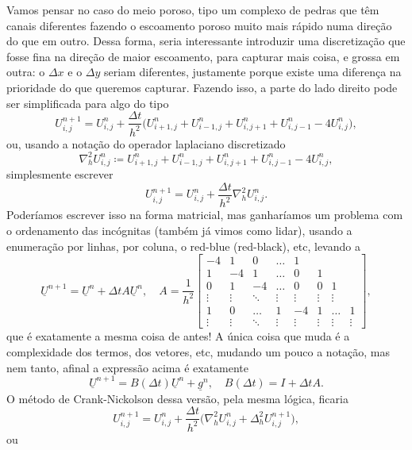 \documentclass[../differential_methods.tex]{subfiles}
\begin{document}
Vamos pensar no caso do meio poroso, tipo um complexo de pedras que têm canais diferentes fazendo o escoamento poroso muito mais rápido numa direção do que em outro. Dessa forma, seria interessante introduzir uma discretização que fosse fina na direção de maior escoamento, para capturar mais coisa, e grossa em outra: o \(\Delta x\) e o \(\Delta y\) seriam diferentes, justamente porque existe uma diferença na prioridade do que queremos capturar. Fazendo isso, a parte do lado direito pode ser simplificada para algo do tipo
\[
	U_{i,j}^{n+1} = U_{i, j}^{n}+\frac{\Delta t}{h^{2}}\biggl(U_{i+1, j}^{n} + U_{i-1, j}^{n} + U_{i, j+1}^{n} + U_{i, j-1}^{n} - 4U_{i, j}^{n}\biggr),
\]
ou, usando a notação do operador laplaciano discretizado
\[
	\nabla_{h}^{2} U_{i, j}^{n} \coloneqq U_{i+1, j}^{n} + U_{i-1, j}^{n} + U_{i, j+1}^{n} + U_{i, j-1}^{n} - 4U_{i, j}^{n},
\]
simplesmente escrever
\[
	U_{i, j}^{n+1} = U_{i, j}^{n} + \frac{\Delta t}{h^{2}}\nabla_{h}^{2}U_{i, j}^{n}.
\]
Poderíamos escrever isso na forma matricial, mas ganharíamos um problema com o ordenamento das incógnitas (também já vimos como lidar), usando a enumeração por linhas, por coluna, o red-blue (red-black), etc, levando a
\[
	\underline{U}^{n+1} = \underline{U}^{n} + \Delta t A \underline{U}^{n}, \quad A = \frac{1}{h^{2}}\begin{bmatrix}
		-4     & 1      & 0      & \dotsc & 1      &        &        &        \\
		1      & -4     & 1      & \dotsc & 0      & 1      &        &        \\
		0      & 1      & -4     & \dotsc & 0      & 0      & 1      &        \\
		\vdots & \vdots & \ddots & \vdots & \vdots & \vdots & \vdots &        \\
		1      & 0      & \dotsc & 1      & -4     & 1      & \dotsc & 1      \\
		\vdots & \vdots & \ddots & \vdots & \vdots & \vdots & \vdots & \vdots
	\end{bmatrix},
\]
que é exatamente a mesma coisa de antes! A única coisa que muda é a complexidade dos termos, dos vetores, etc, mudando um pouco a notação, mas nem tanto, afinal a expressão acima é exatamente
\[
	\underline{U}^{n+1} = B(\Delta t)\underline{U}^{n} + \underline{g}^{n}, \quad B(\Delta t) = I + \Delta tA.
\]
O método de Crank-Nickolson dessa versão, pela mesma lógica, ficaria
\[
	U_{i, j}^{n+1} = U_{i, j}^{n} + \frac{\Delta t}{h^{2}}\biggl(\nabla_{h}^{2} U_{i, j}^{n} + \Delta_{h}^{2}U_{i, j}^{n+1}\biggr),
\]
ou
\end{document}
